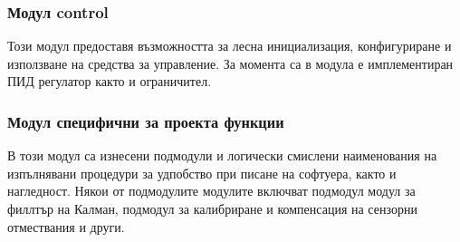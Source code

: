 \subsubsection{Модул control}

Този модул предоставя възможността за лесна инициализация,
конфигуриране и използване на средства за управление.
За момента са в модула е имплементиран ПИД регулатор както и ограничител.

\subsubsection{Модул специфични за проекта функции}

В този модул са изнесени подмодули и логически смислени наименования на изпълнявани процедури
за удпобство при писане на софтуера, както и нагледност.
Някои от подмодулите модулите включват подмодул модул за филлтър на Калман,
подмодул за калибриране и компенсация на сензорни отмествания и други.